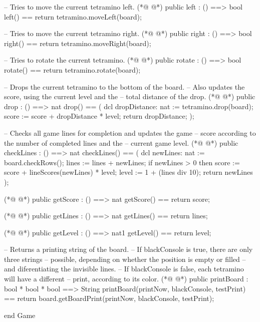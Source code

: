 \begin{vdmpp}[breaklines=true]
    -- Tries to move the current tetramino left.
(*@
\label{left:77}
@*)
  public left : () ==> bool
  left() ==
   return tetramino.moveLeft(board);

    -- Tries to move the current tetramino right.
(*@
\label{right:82}
@*)
  public right : () ==> bool
  right() ==
   return tetramino.moveRight(board);
   
    -- Tries to rotate the current tetramino.
(*@
\label{rotate:87}
@*)
  public rotate : () ==> bool
  rotate() ==
   return tetramino.rotate(board);

    -- Drops the current tetramino to the bottom of the board. 
    -- Also updates the score, using the current level and the
    -- total distance of the drop. 
(*@
\label{drop:94}
@*)
  public drop : () ==> nat
  drop() == (
   dcl dropDistance: nat := tetramino.drop(board);
   score := score + dropDistance * level;
   return dropDistance;
  );
  
  -- Checks all game lines for completion and updates the game
  -- score according to the number of completed lines and the
  -- current game level.
(*@
\label{checkLines:104}
@*)
  public checkLines : () ==> nat
  checkLines() == (
   dcl newLines: nat := board.checkRows();
   lines := lines + newLines;
   if newLines > 0 then score := score + lineScores(newLines) * level;
   level := 1 + (lines div 10);
   return newLines
  );

(*@
\label{getScore:113}
@*)
  public getScore : () ==> nat
  getScore() == return score;
   
(*@
\label{getLines:116}
@*)
  public getLines : () ==> nat
  getLines() == return lines;

(*@
\label{getLevel:119}
@*)
  public getLevel : () ==> nat1
  getLevel() == return level;
  
  -- Returns a printing string of the board.
  -- If blackConsole is true, there are only three strings
  -- possible, depending on whether the position is empty or filled
  -- and diferentiating the invisible lines.
  -- If blackConsole is false, each tetramino will have a different
  -- print, according to its color.
(*@
\label{printBoard:128}
@*)
  public printBoard : bool * bool * bool ==> String
  printBoard(printNow, blackConsole, testPrint) == 
   return board.getBoardPrint(printNow, blackConsole, testPrint);
   
end Game
\end{vdmpp}
